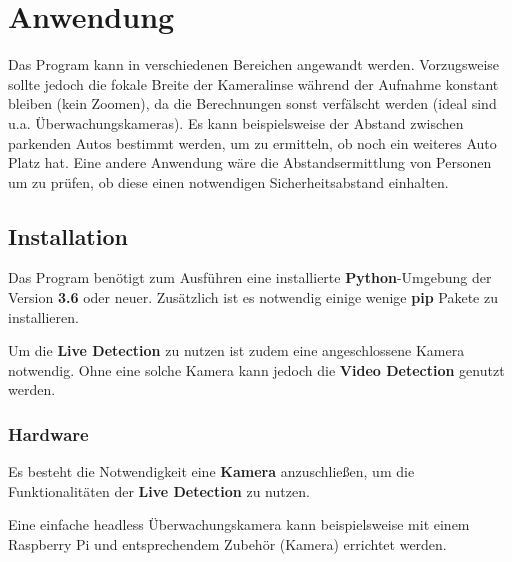 \documentclass[12pt]{article}
\theoremstyle{definition}
\begin{document}
\newpage

\section{Anwendung}
\begin{flushleft}
Das Program kann in verschiedenen Bereichen angewandt werden. Vorzugsweise sollte jedoch die fokale Breite der Kameralinse während der Aufnahme konstant bleiben (kein Zoomen), da die Berechnungen sonst verfälscht werden (ideal sind u.a. Überwachungskameras). Es kann beispielsweise der Abstand zwischen parkenden Autos bestimmt werden, um zu ermitteln, ob noch ein weiteres Auto Platz hat. Eine andere Anwendung wäre die Abstandsermittlung von Personen um zu prüfen, ob diese einen notwendigen Sicherheitsabstand einhalten.
\end{flushleft}

\subsection{Installation}
\begin{flushleft}
Das Program benötigt zum Ausführen eine installierte \textbf{Python}-Umgebung der Version \textbf{3.6} oder neuer. Zusätzlich ist es notwendig einige wenige \textbf{pip} Pakete zu installieren.

Um die \textbf{Live Detection} zu nutzen ist zudem eine angeschlossene Kamera notwendig. Ohne eine solche Kamera kann jedoch die \textbf{Video Detection} genutzt werden.
\end{flushleft}

\subsubsection{Hardware}
\begin{flushleft}
Es besteht die Notwendigkeit eine \textbf{Kamera} anzuschließen, um die Funktionalitäten der \textbf{Live Detection} zu nutzen.

Eine einfache headless Überwachungskamera kann beispielsweise mit einem Raspberry Pi und entsprechendem Zubehör (Kamera) errichtet werden.


\end{flushleft}
\end{document}
